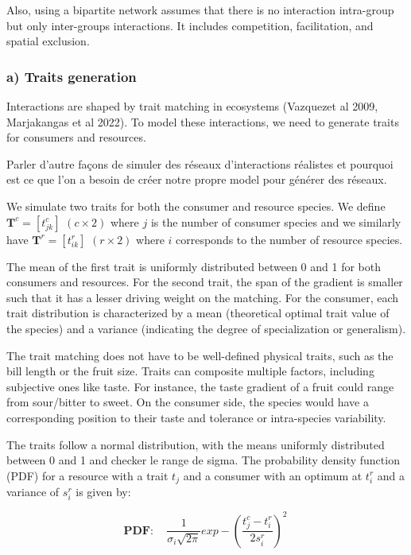 Also, using a bipartite network assumes that there is no interaction intra-group but only inter-groups interactions. It includes competition, facilitation, and spatial exclusion.




\subsubsection{a) Traits generation}

Interactions are shaped by trait matching in ecosystems (Vazquezet al 2009, Marjakangas et al 2022). To model these interactions, we need to generate traits for consumers and resources.

Parler d'autre façons de simuler des réseaux d'interactions réalistes et pourquoi est ce que l'on a besoin de créer notre propre model pour générer des réseaux.

We simulate two traits for both the consumer and resource species. We define $\mathbf{T}^c = [t^c_{jk}]$ $(c \times 2)$ where $j$ is the number of consumer species and we similarly have $\mathbf{T}^r = [t^r_{ik}]$ $(r \times 2)$ where $i$ corresponds to the number of resource species.

The mean of the first trait is uniformly distributed between 0 and 1 for both consumers and resources. For the second trait, the span of the gradient is smaller such that it has a lesser  driving weight on the matching.
For the consumer, each trait distribution is characterized by a mean (theoretical optimal trait value of the species) and a variance (indicating the degree of specialization or generalism).

The trait matching does not have to be well-defined physical traits, such as the bill length or the fruit size. Traits can composite multiple factors, including subjective ones like taste. For instance, the taste gradient of a fruit could range from sour/bitter to sweet. On the consumer side, the species would have a corresponding position to their taste and tolerance or intra-species variability.

The traits follow a normal distribution, with the means uniformly distributed between 0 and 1 and checker le range de sigma. The probability density function (PDF) for a resource with a trait $t_j$ and a consumer with an optimum at $t_i^r$ and a variance of $s_i^r$ is given by:

$$
    \mathbf{PDF:} \quad \frac{1}{\sigma_i\sqrt{2\pi}} exp -\left(\frac{t_j^c-t_i^r}{2s_i^r}\right)^{\!2}\
$$

